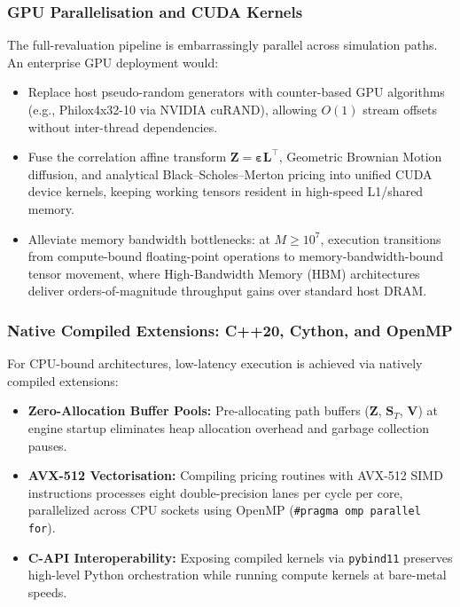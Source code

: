 \documentclass{article}
\theoremstyle{plain}
\theoremstyle{definition}
\theoremstyle{remark}
\begin{document}
\subsubsection{GPU Parallelisation and CUDA Kernels}
The full-revaluation pipeline is embarrassingly parallel across simulation paths. An enterprise GPU deployment would:
\begin{itemize}
    \item Replace host pseudo-random generators with counter-based GPU algorithms (e.g., Philox4x32-10 via NVIDIA cuRAND), allowing $O(1)$ stream offsets without inter-thread dependencies.
    \item Fuse the correlation affine transform $\mathbf{Z} = \boldsymbol{\varepsilon}\mathbf{L}^\top$, Geometric Brownian Motion diffusion, and analytical Black--Scholes--Merton pricing into unified CUDA device kernels, keeping working tensors resident in high-speed L1/shared memory.
    \item Alleviate memory bandwidth bottlenecks: at $M \ge 10^7$, execution transitions from compute-bound floating-point operations to memory-bandwidth-bound tensor movement, where High-Bandwidth Memory (HBM) architectures deliver orders-of-magnitude throughput gains over standard host DRAM.
\end{itemize}

\subsubsection{Native Compiled Extensions: C++20, Cython, and OpenMP}
For CPU-bound architectures, low-latency execution is achieved via natively compiled extensions:
\begin{itemize}
    \item \textbf{Zero-Allocation Buffer Pools:} Pre-allocating path buffers ($\mathbf{Z}$, $\mathbf{S}_T$, $\mathbf{V}$) at engine startup eliminates heap allocation overhead and garbage collection pauses.
    \item \textbf{AVX-512 Vectorisation:} Compiling pricing routines with AVX-512 SIMD instructions processes eight double-precision lanes per cycle per core, parallelized across CPU sockets using OpenMP (\texttt{\#pragma omp parallel for}).
    \item \textbf{C-API Interoperability:} Exposing compiled kernels via \texttt{pybind11} preserves high-level Python orchestration while running compute kernels at bare-metal speeds.
\end{itemize}
\end{document}
